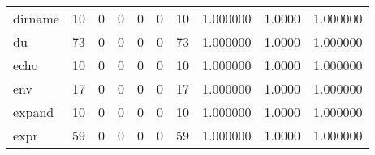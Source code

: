 \begin{tabular}{lrrrrrrrrr}
dirname   &                                       10 &                                                  0 &                                                  0 &                                                  0 &                                                  0 &                                                 10 &                                           1.000000 &                                 1.0000 &                             1.000000 \\
du        &                                       73 &                                                  0 &                                                  0 &                                                  0 &                                                  0 &                                                 73 &                                           1.000000 &                                 1.0000 &                             1.000000 \\
echo      &                                       10 &                                                  0 &                                                  0 &                                                  0 &                                                  0 &                                                 10 &                                           1.000000 &                                 1.0000 &                             1.000000 \\
env       &                                       17 &                                                  0 &                                                  0 &                                                  0 &                                                  0 &                                                 17 &                                           1.000000 &                                 1.0000 &                             1.000000 \\
expand    &                                       10 &                                                  0 &                                                  0 &                                                  0 &                                                  0 &                                                 10 &                                           1.000000 &                                 1.0000 &                             1.000000 \\
expr      &                                       59 &                                                  0 &                                                  0 &                                                  0 &                                                  0 &                                                 59 &                                           1.000000 &                                 1.0000 &                             1.000000 \\

\end{tabular}
